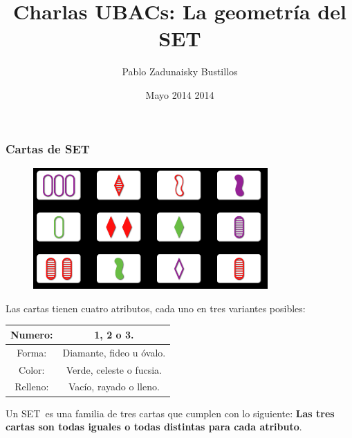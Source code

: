 \documentclass[smaller,usepdftitle=false]{beamer}
\title[]{Charlas UBACs: La geometr\'ia del SET}
\author[]{Pablo Zadunaisky Bustillos}
\date{Mayo 2014 2014}
\newcommand\SET{\textsf{SET}}
\begin{document}
\let\pause\relax
\begin{frame}
\titlepage
\end{frame}

\begin{frame}
\frametitle{Cartas de SET}
\begin{figure}[h!]
\centering
\includegraphics[width=0.8\textwidth]{cards2}
\end{figure}
\end{frame}

\begin{frame}
Las cartas tienen cuatro atributos, cada uno en tres variantes posibles:
\begin{table}
\centering
\begin{tabular}{|c |c|}
\hline
Numero: & 1, 2 o 3.  \\
\hline
Forma: & Diamante, fideo u óvalo.\\
\hline
Color: &Verde, celeste o fucsia.\\
\hline
Relleno: &Vacío, rayado o lleno.\\
\hline
\end{tabular}
\end{table}
\pause

Un \SET~es una familia de tres cartas que cumplen con lo siguiente: \textbf{Las
tres cartas son todas iguales o todas distintas para cada atributo}. 
\end{frame}
\end{document}
